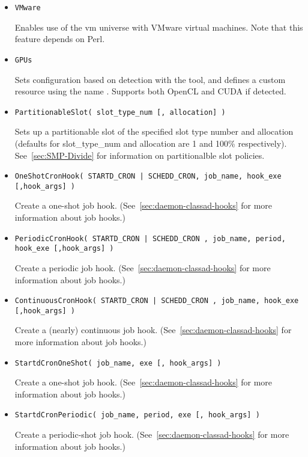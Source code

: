 \begin{description}
\begin{itemize}
    \item \texttt{VMware}

    Enables use of the vm universe with VMware virtual machines.
    Note that this feature depends on Perl. 

    \item \texttt{GPUs}

    Sets configuration based on detection with the 
    tool, and defines a custom resource using the name .
    Supports both OpenCL and CUDA if detected. 

    \item \texttt{PartitionableSlot( slot\_type\_num [, allocation] )}

   	Sets up a partitionable slot of the specified slot type number
	and allocation (defaults for slot\_type\_num and allocation
	are 1 and 100\% respectively).
	See~\ref{sec:SMP-Divide} for information on partitionalble
	slot policies.
	
    \item \texttt{OneShotCronHook( STARTD\_CRON | SCHEDD\_CRON, job\_name,
	hook\_exe [,hook\_args] )}

	Create a one-shot job hook.
	(See~\ref{sec:daemon-classad-hooks} for more information about job hooks.)

    \item \texttt{PeriodicCronHook( STARTD\_CRON | SCHEDD\_CRON , job\_name,
	period, hook\_exe [,hook\_args] )}

	Create a periodic job hook.
	(See~\ref{sec:daemon-classad-hooks} for more information about job hooks.)

    \item \texttt{ContinuousCronHook( STARTD\_CRON | SCHEDD\_CRON ,
	job\_name, hook\_exe [,hook\_args] )}

	Create a (nearly) continuous job hook.
	(See~\ref{sec:daemon-classad-hooks} for more information about job hooks.)

    \item \texttt{StartdCronOneShot( job\_name, exe [, hook\_args] )}

	Create a one-shot  job hook.
	(See~\ref{sec:daemon-classad-hooks} for more information about job hooks.)

    \item \texttt{StartdCronPeriodic( job\_name, period, exe [, hook\_args] )}

	Create a periodic-shot  job hook.
	(See~\ref{sec:daemon-classad-hooks} for more information about job hooks.)


\end{itemize}
\end{description}
